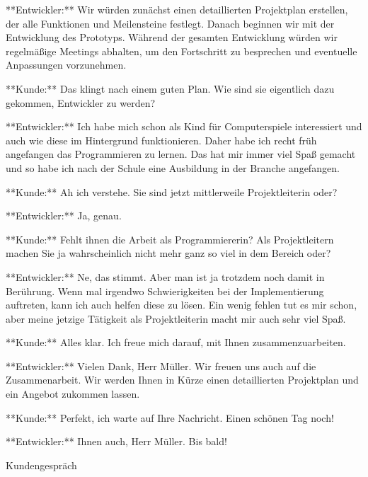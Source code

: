 \begin{prompt}[H]
    \begin{tcolorbox}[colback=gray!20, colframe=gray!20, boxrule=0pt, sharp corners] 
        **Entwickler:** Wir würden zunächst einen detaillierten Projektplan erstellen, der alle Funktionen und Meilensteine festlegt. Danach beginnen wir mit der Entwicklung des Prototyps. Während der gesamten Entwicklung würden wir regelmäßige Meetings abhalten, um den Fortschritt zu besprechen und eventuelle Anpassungen vorzunehmen.
        
        **Kunde:** Das klingt nach einem guten Plan. Wie sind sie eigentlich dazu gekommen, Entwickler zu werden?
        
        **Entwickler:** Ich habe mich schon als Kind für Computerspiele interessiert und auch wie diese im Hintergrund funktionieren. Daher habe ich recht früh angefangen das Programmieren zu lernen. Das hat mir immer viel Spaß gemacht und so habe ich nach der Schule eine Ausbildung in der Branche angefangen.
        
        **Kunde:** Ah ich verstehe. Sie sind jetzt mittlerweile Projektleiterin oder?
        
        **Entwickler:** Ja, genau.
        
        **Kunde:** Fehlt ihnen die Arbeit als Programmiererin? Als Projektleitern machen Sie ja wahrscheinlich nicht mehr ganz so viel in dem Bereich oder?
        
        **Entwickler:** Ne, das stimmt. Aber man ist ja trotzdem noch damit in Berührung. Wenn mal irgendwo Schwierigkeiten bei der Implementierung auftreten, kann ich auch helfen diese zu lösen. Ein wenig fehlen tut es mir schon, aber meine jetzige Tätigkeit als Projektleiterin macht mir auch sehr viel Spaß.
        
        **Kunde:** Alles klar. Ich freue mich darauf, mit Ihnen zusammenzuarbeiten.
        
        **Entwickler:** Vielen Dank, Herr Müller. Wir freuen uns auch auf die Zusammenarbeit. Wir werden Ihnen in Kürze einen detaillierten Projektplan und ein Angebot zukommen lassen.
        
        **Kunde:** Perfekt, ich warte auf Ihre Nachricht. Einen schönen Tag noch!
        
        **Entwickler:** Ihnen auch, Herr Müller. Bis bald!
        \vfill
    \end{tcolorbox}
    \caption{Kundengespräch}
    \label{Kundengespräch2}
\end{prompt}


